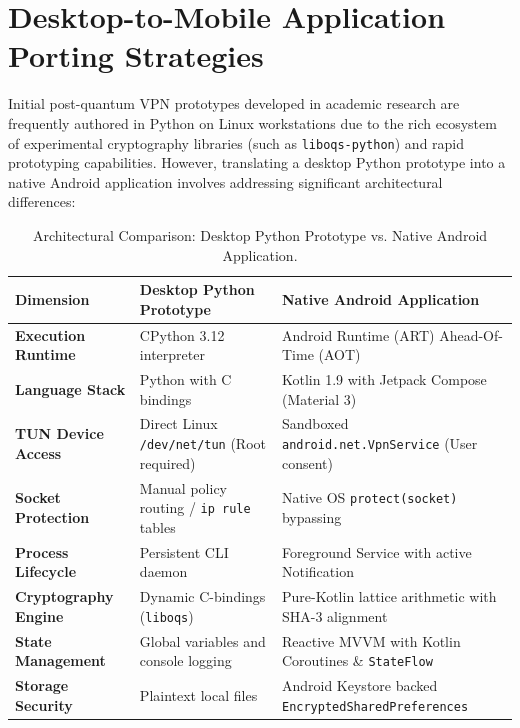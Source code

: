 \section{Desktop-to-Mobile Application Porting Strategies}
\label{sec:desktop_to_mobile_porting}

Initial post-quantum VPN prototypes developed in academic research are frequently authored in Python on Linux workstations due to the rich ecosystem of experimental cryptography libraries (such as \texttt{liboqs-python}) and rapid prototyping capabilities. However, translating a desktop Python prototype into a native Android application involves addressing significant architectural differences:

\begin{table}[htbp]
  \centering
  \small
  \caption{Architectural Comparison: Desktop Python Prototype vs. Native Android Application.}
  \label{tab:python_vs_android_architecture}
  \begin{tabular}{@{}P{3.5cm}P{5.0cm}P{5.5cm}@{}}
    \toprule
    \textbf{Dimension} & \textbf{Desktop Python Prototype} & \textbf{Native Android Application} \\
    \midrule
    \textbf{Execution Runtime} & CPython 3.12 interpreter & Android Runtime (ART) Ahead-Of-Time (AOT) \\
    \textbf{Language Stack} & Python with C bindings & Kotlin 1.9 with Jetpack Compose (Material 3) \\
    \textbf{TUN Device Access} & Direct Linux \texttt{/dev/net/tun} (Root required) & Sandboxed \texttt{android.net.VpnService} (User consent) \\
    \textbf{Socket Protection} & Manual policy routing / \texttt{ip rule} tables & Native OS \texttt{protect(socket)} bypassing \\
    \textbf{Process Lifecycle} & Persistent CLI daemon & Foreground Service with active Notification \\
    \textbf{Cryptography Engine} & Dynamic C-bindings (\texttt{liboqs}) & Pure-Kotlin lattice arithmetic with SHA-3 alignment \\
    \textbf{State Management} & Global variables and console logging & Reactive MVVM with Kotlin Coroutines \& \texttt{StateFlow} \\
    \textbf{Storage Security} & Plaintext local files & Android Keystore backed \texttt{EncryptedSharedPreferences} \\
    \bottomrule
  \end{tabular}
\end{table}

